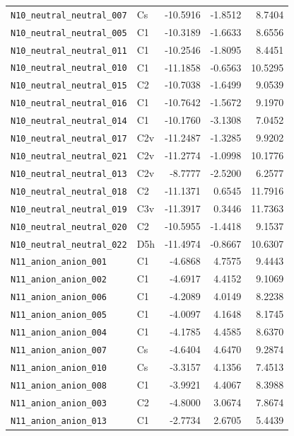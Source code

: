 {\begin{longtable}{@{}p{4.6cm}p{1.6cm}rrr@{}}
\texttt{N10\_neutral\_neutral\_007} & Cs & -10.5916 & -1.8512 & 8.7404 \\
\texttt{N10\_neutral\_neutral\_005} & C1 & -10.3189 & -1.6633 & 8.6556 \\
\texttt{N10\_neutral\_neutral\_011} & C1 & -10.2546 & -1.8095 & 8.4451 \\
\texttt{N10\_neutral\_neutral\_010} & C1 & -11.1858 & -0.6563 & 10.5295 \\
\texttt{N10\_neutral\_neutral\_015} & C2 & -10.7038 & -1.6499 & 9.0539 \\
\texttt{N10\_neutral\_neutral\_016} & C1 & -10.7642 & -1.5672 & 9.1970 \\
\texttt{N10\_neutral\_neutral\_014} & C1 & -10.1760 & -3.1308 & 7.0452 \\
\texttt{N10\_neutral\_neutral\_017} & C2v & -11.2487 & -1.3285 & 9.9202 \\
\texttt{N10\_neutral\_neutral\_021} & C2v & -11.2774 & -1.0998 & 10.1776 \\
\texttt{N10\_neutral\_neutral\_013} & C2v & -8.7777 & -2.5200 & 6.2577 \\
\texttt{N10\_neutral\_neutral\_018} & C2 & -11.1371 & 0.6545 & 11.7916 \\
\texttt{N10\_neutral\_neutral\_019} & C3v & -11.3917 & 0.3446 & 11.7363 \\
\texttt{N10\_neutral\_neutral\_020} & C2 & -10.5955 & -1.4418 & 9.1537 \\
\texttt{N10\_neutral\_neutral\_022} & D5h & -11.4974 & -0.8667 & 10.6307 \\
\addlinespace
\texttt{N11\_anion\_anion\_001} & C1 & -4.6868 & 4.7575 & 9.4443 \\
\texttt{N11\_anion\_anion\_002} & C1 & -4.6917 & 4.4152 & 9.1069 \\
\texttt{N11\_anion\_anion\_006} & C1 & -4.2089 & 4.0149 & 8.2238 \\
\texttt{N11\_anion\_anion\_005} & C1 & -4.0097 & 4.1648 & 8.1745 \\
\texttt{N11\_anion\_anion\_004} & C1 & -4.1785 & 4.4585 & 8.6370 \\
\texttt{N11\_anion\_anion\_007} & Cs & -4.6404 & 4.6470 & 9.2874 \\
\texttt{N11\_anion\_anion\_010} & Cs & -3.3157 & 4.1356 & 7.4513 \\
\texttt{N11\_anion\_anion\_008} & C1 & -3.9921 & 4.4067 & 8.3988 \\
\texttt{N11\_anion\_anion\_003} & C2 & -4.8000 & 3.0674 & 7.8674 \\
\texttt{N11\_anion\_anion\_013} & C1 & -2.7734 & 2.6705 & 5.4439 \\

\end{longtable}}
